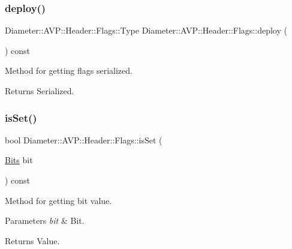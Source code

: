 \subsubsection{\texorpdfstring{deploy()}{deploy()}}
{\footnotesize\ttfamily Diameter\+::\+A\+V\+P\+::\+Header\+::\+Flags\+::\+Type Diameter\+::\+A\+V\+P\+::\+Header\+::\+Flags\+::deploy (\begin{DoxyParamCaption}{ }\end{DoxyParamCaption}) const}



Method for getting flags serialized. 

\begin{DoxyReturn}{Returns}
Serialized. 
\end{DoxyReturn}
\mbox{\label{classDiameter_1_1AVP_1_1Header_1_1Flags_a8828e3f2e9d6242d8577178f6a910efd}} 
\subsubsection{\texorpdfstring{is\+Set()}{isSet()}}
{\footnotesize\ttfamily bool Diameter\+::\+A\+V\+P\+::\+Header\+::\+Flags\+::is\+Set (\begin{DoxyParamCaption}\item[{\hyperlink{classDiameter_1_1AVP_1_1Header_1_1Flags_af24fa00d6135e01a5b58c9ae84245262}{Bits}}]{bit }\end{DoxyParamCaption}) const}



Method for getting bit value. 


\begin{DoxyParams}{Parameters}
{\em bit} & Bit. \\
\hline
\end{DoxyParams}
\begin{DoxyReturn}{Returns}
Value. 
\end{DoxyReturn}
\mbox{\label{classDiameter_1_1AVP_1_1Header_1_1Flags_a6ab05074bd270c9593f524151443c879}} 
